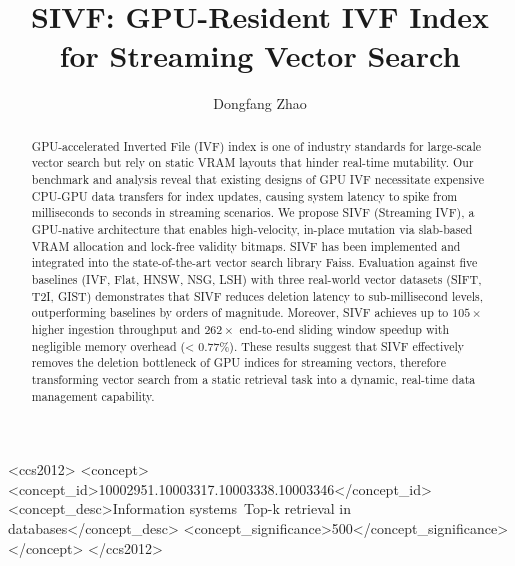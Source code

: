 \documentclass[sigconf,anonymous]{acmart}
\theoremstyle{plain}
\theoremstyle{definition}
\theoremstyle{remark}
\begin{document}
\title{SIVF: GPU-Resident IVF Index for Streaming Vector Search}

\author{Dongfang Zhao}

\begin{abstract}
GPU-accelerated Inverted File (IVF) index is one of industry standards for large-scale vector search but rely on static VRAM layouts that hinder real-time mutability. Our benchmark and analysis reveal that existing designs of GPU IVF necessitate expensive CPU-GPU data transfers for index updates, causing system latency to spike from milliseconds to seconds in streaming scenarios. We propose SIVF (Streaming IVF), a GPU-native architecture that enables high-velocity, in-place mutation via slab-based VRAM allocation and lock-free validity bitmaps. SIVF has been implemented and integrated into the state-of-the-art vector search library Faiss. Evaluation against five baselines (IVF, Flat, HNSW, NSG, LSH) with three real-world vector datasets (SIFT, T2I, GIST) demonstrates that SIVF reduces deletion latency to sub-millisecond levels, outperforming baselines by orders of magnitude. Moreover, SIVF achieves up to $105\times$ higher ingestion throughput and $262\times$ end-to-end sliding window speedup with negligible memory overhead (< 0.77\%). These results suggest that SIVF effectively removes the deletion bottleneck of GPU indices for streaming vectors, therefore transforming vector search from a static retrieval task into a dynamic, real-time data management capability.
\end{abstract}
\maketitle


\begin{CCSXML}
<ccs2012>
   <concept>
       <concept_id>10002951.10003317.10003338.10003346</concept_id>
       <concept_desc>Information systems~Top-k retrieval in databases</concept_desc>
       <concept_significance>500</concept_significance>
       </concept>
 </ccs2012>
\end{CCSXML}

\end{document}
